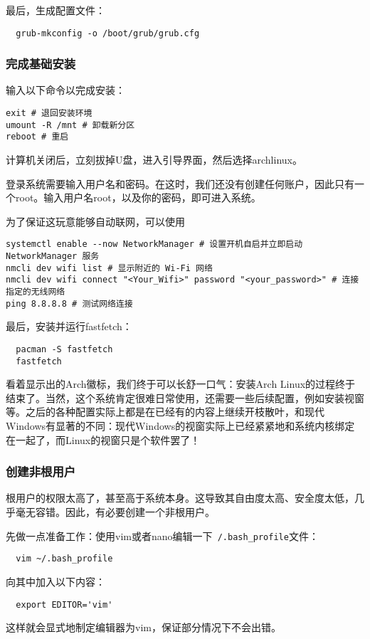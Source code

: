 \documentclass[../main.tex]{subfiles}
\begin{document}
最后，生成配置文件：
\begin{lstlisting}
  grub-mkconfig -o /boot/grub/grub.cfg
\end{lstlisting}

\subsubsection{完成基础安装}

输入以下命令以完成安装：
\begin{lstlisting}
exit # 退回安装环境
umount -R /mnt # 卸载新分区
reboot # 重启
\end{lstlisting}
计算机关闭后，立刻拔掉U盘，进入引导界面，然后选择archlinux。

登录系统需要输入用户名和密码。在这时，我们还没有创建任何账户，因此只有一个root。输入用户名root，以及你的密码，即可进入系统。

为了保证这玩意能够自动联网，可以使用
\begin{lstlisting}
systemctl enable --now NetworkManager # 设置开机自启并立即启动 NetworkManager 服务
nmcli dev wifi list # 显示附近的 Wi-Fi 网络
nmcli dev wifi connect "<Your_Wifi>" password "<your_password>" # 连接指定的无线网络
ping 8.8.8.8 # 测试网络连接
\end{lstlisting}

最后，安装并运行fastfetch：
\begin{lstlisting}
  pacman -S fastfetch
  fastfetch
\end{lstlisting}
看着显示出的Arch徽标，我们终于可以长舒一口气：安装Arch Linux的过程终于结束了。当然，这个系统肯定很难日常使用，还需要一些后续配置，例如安装视窗等。之后的各种配置实际上都是在已经有的内容上继续开枝散叶，和现代Windows有显著的不同：现代Windows的视窗实际上已经紧紧地和系统内核绑定在一起了，而Linux的视窗只是个软件罢了！

\subsubsection{创建非根用户}

根用户的权限太高了，甚至高于系统本身。这导致其自由度太高、安全度太低，几乎毫无容错。因此，有必要创建一个非根用户。

先做一点准备工作：使用vim或者nano编辑一下\texttt{~/.bash\_profile}文件：
\begin{lstlisting}
  vim ~/.bash_profile
\end{lstlisting}
向其中加入以下内容：
\begin{lstlisting}
  export EDITOR='vim'
\end{lstlisting}
这样就会显式地制定编辑器为vim，保证部分情况下不会出错。
\end{document}

